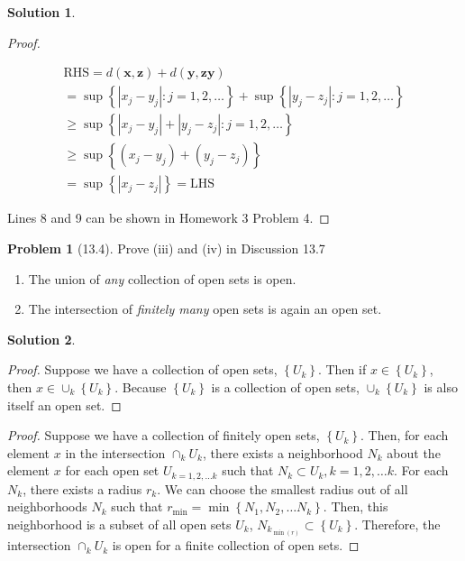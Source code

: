 \documentclass[12pt]{article}
\theoremstyle{definition} %
\newtheorem{solution}{Solution}
\newtheorem{problem}{Problem}
\theoremstyle{plain} %
\begin{document}
\begin{solution}
\begin{proof}
\begin{enumerate}
   \begin{align}
\text{RHS} = d(\mathbf{x}, \mathbf{z})+d(\mathbf{y}, \mathbf{zy})\\[10pt] 
= \sup\left\{ \left\vert x_{j}-y_{j} \right\vert : j=1,2, \ldots   \right\}+ \sup\left\{ \left\vert y_{j}-z_{j} \right\vert : j=1,2, \ldots   \right\} \\[10pt] 
\geq  \sup\left\{ \left\vert x_{j}-y_{j} \right\vert +\left\vert y_{j} -z_{j}  \right\vert : j=1,2, \ldots   \right\}\\[10pt] 
\geq \sup \left\{ (x_{j} -y_{j} )+(y_{j} -z_{j} ) \right\} \\[10pt] 
=\sup \left\{ \left\vert x_{j} -z_{j} \right\vert   \right\} =\text{LHS} 
   \end{align}
\end{enumerate} 
Lines 8 and 9 can be shown in Homework 3 Problem 4.
\end{proof}
\end{solution}

\begin{problem}[13.4]
    Prove (iii) and (iv) in Discussion 13.7
    \begin{enumerate}
        \item The union of \emph{any} collection of open sets is open.
        \item The intersection of \emph{finitely many} open sets is again an open set.
    \end{enumerate}
\end{problem}

\begin{solution}
    \item \begin{proof}
        Suppose we have a collection of open sets, $\left\{ U_k\right\} $. Then if $x\in \left\{ U_k\right\} $, then $x\in \cup_k \left\{ U_k \right\} $. Because $\left\{ U_k \right\} $ is a collection of open sets, $\cup_k \left\{ U_k \right\} $ is also itself an open set. 
    \end{proof}
    \item \begin{proof}
        Suppose we have a collection of finitely open sets, $\left\{ U_k \right\}$. Then, for each element $x$ in the intersection $\cap_k U_k$, there exists a neighborhood $N_k$ about the element $x$ for each open set $U_{ k=1,2, \ldots  k}  $ such that $N_k\subset U_k, k=1,2, \ldots  k $. For each $N_k$, there exists a radius $r_k$. We can choose the smallest radius out of all neighborhoods $N_k$ such that $r_{\mathop{\min}}=\mathop{\min} \left\{ N_1,N_{2}, \ldots  N_k   \right\} $. Then, this neighborhood is a subset of all open sets $U_k$, $N_{k_{\mathop{\min}(r) } }\subset \left\{U_k \right\} $.  Therefore, the intersection $\cap_k U_k$ is open for a finite collection of open sets.     
    \end{proof}
\end{solution}
\end{document}
